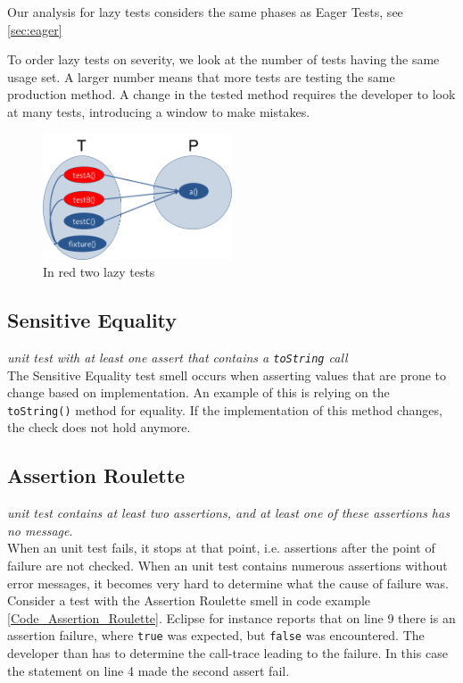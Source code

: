 \documentclass{uvamscse}
\begin{document}
Our analysis for lazy tests considers the same phases as Eager Tests, see \ref{sec:eager}

To order lazy tests on severity, we look at the number of tests having the same usage set. A larger number means that more tests are testing the same production method. A change in the tested method requires the developer to look at many tests, introducing a window to make mistakes.

\begin{figure}[!ht]	
	\centering
	\includegraphics[width=0.5\textwidth]{figures/LazyTest.png}
	\caption{In red two lazy tests}
	\label{fig:LazyTest}
\end{figure}

\subsection{Sensitive Equality}
\emph{unit test with at least one assert that contains a \texttt{toString} call} \\

The Sensitive Equality test smell occurs when asserting values that are prone to change based on implementation. An example of this is relying on the \texttt{toString()} method for equality. If the implementation of this method changes, the check does not hold anymore.\textsl{}

\subsection{Assertion Roulette}
\label{sec:AssertionRoulette}
\emph{unit test contains at least two assertions, and at least one of these assertions has no message}. \\

When an unit test fails, it stops at that point, i.e. assertions after the point of failure are not checked. When an unit test contains numerous assertions without error messages, it becomes very hard to determine what the cause of failure was. Consider a test with the Assertion Roulette smell in code example \ref{Code_Assertion_Roulette}. Eclipse for instance reports that on line 9 there is an assertion failure, where \texttt{true} was expected, but \texttt{false} was encountered. The developer than has to determine the call-trace leading to the failure. In this case the statement on line 4 made the second assert fail.
\end{document}
